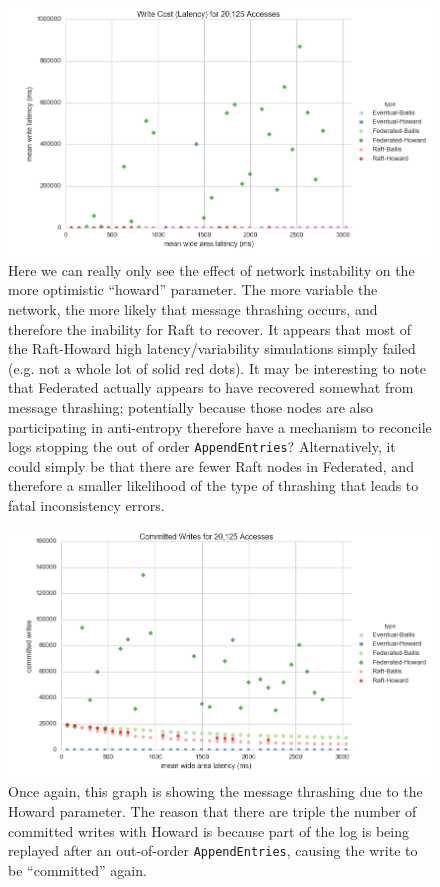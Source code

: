 \documentclass[11pt,letterpaper]{article}
\begin{document}
\begin{figure}[!h]
    \centering
        \includegraphics[width=\textwidth]{figures/write_latency.png}
        \caption{\textsf{Here we can really only see the effect of network instability on the more optimistic ``howard'' parameter. The more variable the network, the more likely that message thrashing occurs, and therefore the inability for Raft to recover. It appears that most of the Raft-Howard high latency/variability simulations simply failed (e.g. not a whole lot of solid red dots). It may be interesting to note that Federated actually appears to have recovered somewhat from message thrashing; potentially because those nodes are also participating in anti-entropy therefore have a mechanism to reconcile logs stopping the out of order \texttt{AppendEntries}? Alternatively, it could simply be that there are fewer Raft nodes in Federated, and therefore a smaller likelihood of the type of thrashing that leads to fatal inconsistency errors.}}
        \label{fig:write_latency}
\end{figure}


\begin{figure}[!h]
    \centering
        \includegraphics[width=\textwidth]{figures/committed_writes.png}
        \caption{\textsf{Once again, this graph is showing the message thrashing due to the Howard parameter. The reason that there are triple the number of committed writes with Howard is because part of the log is being replayed after an out-of-order \texttt{AppendEntries}, causing the write to be ``committed'' again.}}
        \label{fig:committed_writes}
\end{figure}
\end{document}
